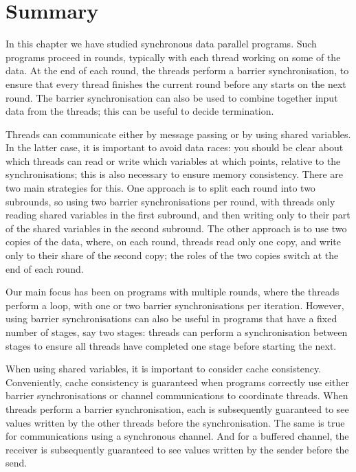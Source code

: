 


\section{Summary}

In this chapter we have studied synchronous data parallel programs.  Such
programs proceed in rounds, typically with each thread working on some of the
data.  At the end of each round, the threads perform a barrier
synchronisation, to ensure that every thread finishes the current round before
any starts on the next round.  The barrier synchronisation can also be used to
combine together input data from the threads; this can be useful to decide
termination. 

Threads can communicate either by message passing or by using shared
variables.  In the latter case, it is important to avoid data races: you
should be clear about which threads can read or write which variables at which
points, relative to the synchronisations; this is also necessary to ensure
memory consistency.  There are two main strategies for this.  One approach is
to split each round into two subrounds, so using two barrier synchronisations
per round, with threads only reading shared variables in the first subround,
and then writing only to their part of the shared variables in the second
subround.  The other approach is to use two copies of the data, where, on each
round, threads read only one copy, and write only to their share of the second
copy; the roles of the two copies switch at the end of each round.

Our main focus has been on programs with multiple rounds, where the
threads perform a loop, with one or two barrier synchronisations per
iteration.  However, using barrier synchronisations can also be useful in
programs that have a fixed number of stages, say two stages: threads can
perform a synchronisation between stages to ensure all threads have completed
one stage before starting the next. 

When using shared variables, it is important to consider cache consistency.
Conveniently, cache consistency is guaranteed when programs correctly use
either barrier synchronisations or channel communications to coordinate
threads.  When threads perform a barrier synchronisation, each is subsequently
guaranteed to see values written by the other threads before the
synchronisation.  The same is true for communications using a synchronous
channel.  And for a buffered channel, the receiver is subsequently guaranteed
to see values written by the sender before the send.



